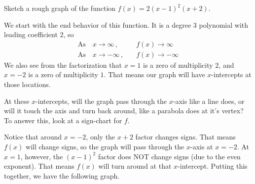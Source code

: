 \documentclass{ximera}
\begin{document}
\begin{example}
	Sketch a rough graph of the function $f(x) = 2(x-1)^2(x+2)$.

	\begin{explanation}
		We start with the end behavior of this function.  It is a degree $3$ polynomial with leading coefficient $2$, so
		\begin{align*}
			\text{As} \quad x \to \infty \, ,  \quad & f(x) \to \infty \\
			\text{As} \quad x \to -\infty \, , \quad & f(x) \to -\infty 
		\end{align*}
		We also see from the factorization that $x=1$ is a zero of multiplicity $2$, and $x=-2$ is a zero of multiplicity $1$.
		That means our graph will have $x$-intercepts at those locations.
		
		At these $x$-intercepts, will the graph pass through the $x$-axis like a line does, or will it touch the axis and turn back
		around, like a parabola does at it's vertex?  To answer this, look at a sign-chart for $f$.

		\begin{center}
		\end{center}
		
		Notice that around $x=-2$, only the $x+2$ factor changes signs.  That means $f(x)$ will change signs, so the graph will pass through the $x$-axis at $x=-2$.
		At $x=1$, however, the $(x-1)^2$ factor does NOT change signs (due to the even exponent).  That means $f(x)$ will turn around at that $x$-intercept.  Putting
		this together, we have the following graph.
		
		\begin{center}
		\end{center}
	\end{explanation}
\end{example}
\end{document}
